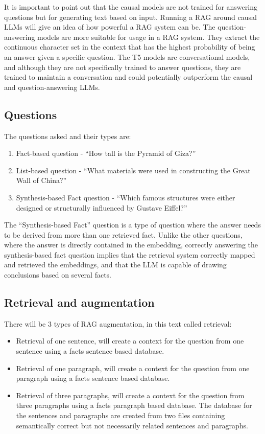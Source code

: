 \documentclass{wseas}
\begin{document}
It is important to point out that the causal models are not trained for
answering questions but for generating text based on input. Running a
RAG around causal LLMs will give an idea of how powerful a RAG system
can be. The question-answering models are more suitable for usage in a
RAG system. They extract the continuous character set in the context
that has the highest probability of being an answer given a specific
question. The T5 models are conversational models, and although they are
not specifically trained to answer questions, they are trained to
maintain a conversation and could potentially outperform the causal and
question-answering LLMs.

\subsection{Questions}

The questions asked and their types are:

\begin{enumerate}
\def\labelenumi{\arabic{enumi}.}
\item
  Fact-based question - ``How tall is the Pyramid of Giza?''
\item
  List-based question - ``What materials were used in constructing the
  Great Wall of China?''
\item
  Synthesis-based Fact question - ``Which famous structures were either
  designed or structurally influenced by Gustave Eiffel?''
\end{enumerate}

The ``Synthesis-based Fact'' question is a type of question where the
answer needs to be derived from more than one retrieved fact. Unlike the
other questions, where the answer is directly contained in the
embedding, correctly answering the synthesis-based fact question implies
that the retrieval system correctly mapped and retrieved the embeddings,
and that the LLM is capable of drawing conclusions based on several
facts.


\subsection{Retrieval and
augmentation}

There will be 3 types of RAG augmentation, in this text called
retrieval:

\begin{itemize}

\item
  Retrieval of one sentence, will create a context for the question from
  one sentence using a facts sentence based database.
\item
  Retrieval of one paragraph, will create a context for the question
  from one paragraph using a facts sentence based database.
\item
  Retrieval of three paragraphs, will create a context for the question
  from three paragraphs using a facts paragraph based database. The
  database for the sentences and paragraphs are created from two files
  containing semantically correct but not necessarily related sentences
  and paragraphs.
\end{itemize}
\end{document}
